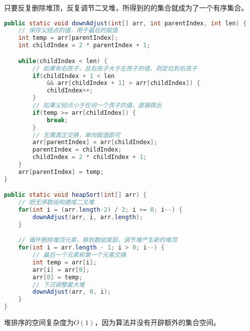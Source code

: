 只要反复删除堆顶，反复调节二叉堆，所得到的的集合就成为了一个有序集合。

\begin{figure}[H]
	\centering
\end{figure}

\vspace{0.5cm}


\begin{lstlisting}[language=Java]
public static void downAdjust(int[] arr, int parentIndex, int len) {
    // 保存父结点的值，用于最后的赋值
    int temp = arr[parentIndex];
    int childIndex = 2 * parentIndex + 1;

    while(childIndex < len) {
        // 如果有右孩子，且右孩子大于左孩子的值，则定位到右孩子
        if(childIndex + 1 < len 
            && arr[childIndex + 1] > arr[childIndex]) {
            childIndex++;
        }
        // 如果父结点小于任何一个孩子的值，直接跳出
        if(temp >= arr[childIndex]) {
            break;
        }
        // 无需真正交换，单向赋值即可
        arr[parentIndex] = arr[childIndex];
        parentIndex = childIndex;
        childIndex = 2 * childIndex + 1;
    }
    arr[parentIndex] = temp;
}

public static void heapSort(int[] arr) {
    // 把无序数组构建成二叉堆
    for(int i = (arr.length-2) / 2; i >= 0; i--) {
        downAdjust(arr, i, arr.length);
    }

    // 循环删除堆顶元素，移到数组尾部，调节堆产生新的堆顶
    for(int i = arr.length - 1; i > 0; i--) {
        // 最后一个元素和第一个元素交换
        int temp = arr[i];
        arr[i] = arr[0];
        arr[0] = temp;
        // 下沉调整最大堆
        downAdjust(arr, 0, i);
    }
}
\end{lstlisting}

堆排序的空间复杂度为$ O(1) $，因为算法并没有开辟额外的集合空间。\\

